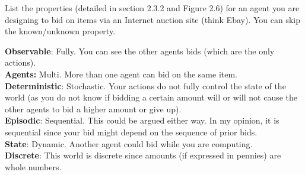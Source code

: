 \documentclass[11pt,letterpaper,addpoints]{exam}
\begin{document}
\begin{questions}
\question List the properties (detailed in section 2.3.2 and Figure 2.6) for an agent you are designing
to bid on items via an Internet auction site (think Ebay).  You can skip the known/unknown property.
\begin{solutionorbox}[4.0 in]

{\bf Observable}: Fully.  You can see the other agents bids (which are the only actions). \\
{\bf Agents:}  Multi. More than one agent can bid on the same item. \\
{\bf Deterministic}: Stochastic.  Your actions do not fully control the state of the world (as you do 
not know if bidding a certain amount will or will not cause the other agents to bid a higher amount or
give up). \\
{\bf Episodic}: Sequential.  This could be argued either way.  In my opinion, it is sequential since
your bid might depend on the sequence of prior bids. \\
{\bf State}: Dynamic.  Another agent could bid while you are computing. \\
{\bf Discrete}: This world is discrete since amounts (if expressed in pennies) are whole numbers. \\
\end{solutionorbox}
\end{questions}
\end{document}
